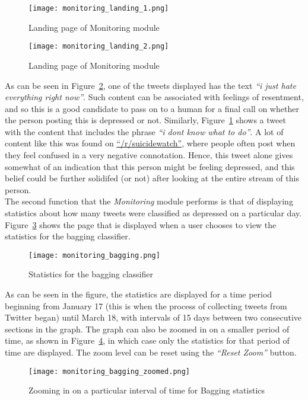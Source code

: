 \begin{figure}
    \centering
    \texttt{[image: monitoring\_landing\_1.png]}
    \caption{Landing page of Monitoring module}
    \label{fig:monitoring_landing_1}
\end{figure}

\begin{figure}
    \centering
    \texttt{[image: monitoring\_landing\_2.png]}
    \caption{Landing page of Monitoring module}
    \label{fig:monitoring_landing_2}
\end{figure}

As can be seen in Figure~\ref{fig:monitoring_landing_2}, one of the tweets displayed has the text \emph{``i just hate everything right now''}. Such content can be associated with feelings of resentment, and so this is a good candidate to pass on to a human for a final call on whether the person posting this is depressed or not. Similarly, Figure~\ref{fig:monitoring_landing_1} shows a tweet with the content that includes the phrase \emph{``i dont know what to do''}. A lot of content like this was found on \href{http://www.reddit.com/r/suicidewatch}{``/r/suicidewatch''}, where people often post when they feel confused in a very negative connotation. Hence, this tweet alone gives somewhat of an indication that this person might be feeling depressed, and this belief could be further solidifed (or not) after looking at the entire stream of this person.\\

The second function that the \emph{Monitoring} module performs is that of displaying statistics about how many tweets were classified as depressed on a particular day. Figure~\ref{fig:monitoring_bagging} shows the page that is displayed when a user chooses to view the statistics for the bagging classifier.\\

\begin{figure}
    \centering
    \texttt{[image: monitoring\_bagging.png]}
    \caption{Statistics for the bagging classifier}
    \label{fig:monitoring_bagging}
\end{figure}

As can be seen in the figure, the statistics are displayed for a time period beginning from January 17 (this is when the process of collecting tweets from Twitter began) until March 18, with intervals of 15 days between two consecutive sections in the graph. The graph can also be zoomed in on a smaller period of time, as shown in Figure~\ref{fig:monitoring_bagging_zoomed}, in which case only the statistics for that period of time are displayed. The zoom level can be reset using the \emph{``Reset Zoom''} button.

\begin{figure}
    \centering
    \texttt{[image: monitoring\_bagging\_zoomed.png]}
    \caption{Zooming in on a particular interval of time for Bagging statistics}
    \label{fig:monitoring_bagging_zoomed}
\end{figure}
